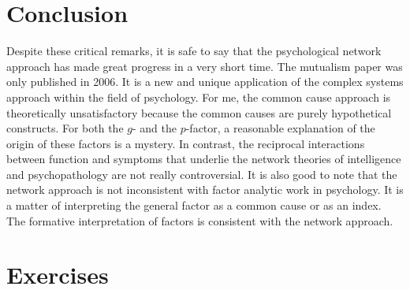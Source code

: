 \documentclass[
  a4paper,
  DIV=11,
  numbers=noendperiod,
  oneside]{scrreprt}
\begin{document}
\hypertarget{sec-Conclusion}{%
\section{Conclusion}\label{sec-Conclusion}}

Despite these critical remarks, it is safe to say that the psychological
network approach has made great progress in a very short time. The
mutualism paper was only published in 2006. It is a new and unique
application of the complex systems approach within the field of
psychology. For me, the common cause approach is theoretically
unsatisfactory because the common causes are purely hypothetical
constructs. For both the \(g\)- and the \(p\)-factor, a reasonable
explanation of the origin of these factors is a mystery. In contrast,
the reciprocal interactions between function and symptoms that underlie
the network theories of intelligence and psychopathology are not really
controversial. It is also good to note that the network approach is not
inconsistent with factor analytic work in psychology. It is a matter of
interpreting the general factor as a common cause or as an index. The
formative interpretation of factors is consistent with the network
approach.

\hypertarget{sec-Exercises}{%
\section{Exercises}\label{sec-Exercises}}
\end{document}
